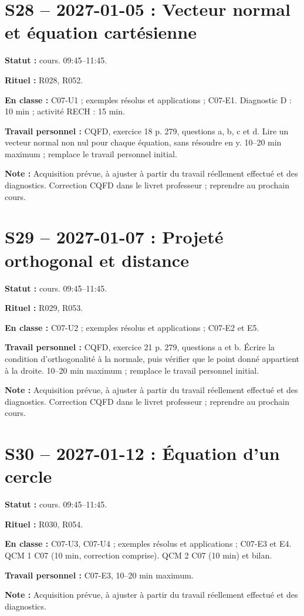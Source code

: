 \section*{S28 -- 2027-01-05 : Vecteur normal et équation cartésienne}
\textbf{Statut :} cours. 09:45–11:45.\par\textbf{Rituel :} R028, R052.\par\textbf{En classe :} C07-U1 ; exemples résolus et applications ; C07-E1. Diagnostic D : 10 min ; activité RECH : 15 min.\par\textbf{Travail personnel :} CQFD, exercice 18 p. 279, questions a, b, c et d. Lire un vecteur normal non nul pour chaque équation, sans résoudre en y. 10–20 min maximum ; remplace le travail personnel initial.\par\textbf{Note :} Acquisition prévue, à ajuster à partir du travail réellement effectué et des diagnostics. Correction CQFD dans le livret professeur ; reprendre au prochain cours.
\section*{S29 -- 2027-01-07 : Projeté orthogonal et distance}
\textbf{Statut :} cours. 09:45–11:45.\par\textbf{Rituel :} R029, R053.\par\textbf{En classe :} C07-U2 ; exemples résolus et applications ; C07-E2 et E5. \par\textbf{Travail personnel :} CQFD, exercice 21 p. 279, questions a et b. Écrire la condition d’orthogonalité à la normale, puis vérifier que le point donné appartient à la droite. 10–20 min maximum ; remplace le travail personnel initial.\par\textbf{Note :} Acquisition prévue, à ajuster à partir du travail réellement effectué et des diagnostics. Correction CQFD dans le livret professeur ; reprendre au prochain cours.
\section*{S30 -- 2027-01-12 : Équation d’un cercle}
\textbf{Statut :} cours. 09:45–11:45.\par\textbf{Rituel :} R030, R054.\par\textbf{En classe :} C07-U3, C07-U4 ; exemples résolus et applications ; C07-E3 et E4.  QCM 1 C07 (10 min, correction comprise). QCM 2 C07 (10 min) et bilan.\par\textbf{Travail personnel :} C07-E3, 10–20 min maximum.\par\textbf{Note :} Acquisition prévue, à ajuster à partir du travail réellement effectué et des diagnostics.

